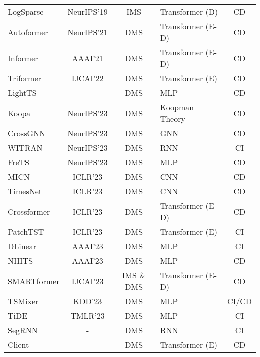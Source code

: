\documentclass[a4paper,oneside,bibliography=totoc]{scrbook}
\begin{document}
{\begin{longtable}{@{}
    >{\raggedright}p{5.5cm}
    c
    c
    >{\centering\arraybackslash}p{2.8cm}
    c}
    \bottomrule
    \endlastfoot
    \midrule
    LogSparse \cite{li_enhancing_2019}       & NeurIPS'19 & IMS  & Transformer (D) &  CD \\
        Autoformer \cite{wu_autoformer_2021}      & NeurIPS'21 & DMS  & Transformer (E-D) & CD\\
        Informer \cite{zhou_informer_2021}        & AAAI'21    & DMS  & Transformer (E-D) & CD\\
        Triformer \cite{cirstea_triformer_2022}      & IJCAI'22   & DMS  & Transformer (E) & CD\\
        LightTS \cite{zhang_less_2022} & - & DMS & MLP & CD \\
        Koopa \cite{liu_koopa_2023} & NeurIPS'23 & DMS  & Koopman Theory \cite{koopman_hamiltonian_1931} & CD\\
        CrossGNN \cite{huang_crossgnn_2023}       & NeurIPS'23    & DMS  & GNN & CD\\
        WITRAN \cite{jia_witran_2023} & NeurIPS'23 & DMS & RNN & CI \\
        FreTS \cite{yi_frequency-domain_2023} & NeurIPS'23 & DMS  & MLP & CD\\
        MICN \cite{wang_micn_2022}     & ICLR'23   & DMS  & CNN & CD\\
        TimesNet    \cite{wu_timesnet_2022}    & ICLR'23    & DMS  & CNN & CD\\
        Crossformer \cite{zhang_crossformer_2022}       & ICLR'23    & DMS  & Transformer (E-D) & CD\\
        PatchTST \cite{nie_time_2022}       & ICLR'23    & DMS  & Transformer (E) & CI\\
        DLinear \cite{zeng_are_2023} & AAAI'23 & DMS & MLP & CI\\
        NHITS  \cite{challu_nhits_2023}      & AAAI'23    & DMS  & MLP & CD\\
        SMARTformer \cite{li_smartformer_2023} & IJCAI'23 & IMS \& DMS & Transformer (E-D) & CD \\
        TSMixer \cite{ekambaram_tsmixer_2023}       & KDD'23   & DMS  & MLP & CI/CD\\
        TiDE \cite{das_long-term_2023}      & TMLR'23    & DMS  & MLP & CI\\
        SegRNN \cite{lin_segrnn_2023}          &       -     & DMS  & RNN & CI\\
        Client \cite{gao_client_2023} & - & DMS & Transformer (E) & CD \\

\end{longtable}}
\end{document}
